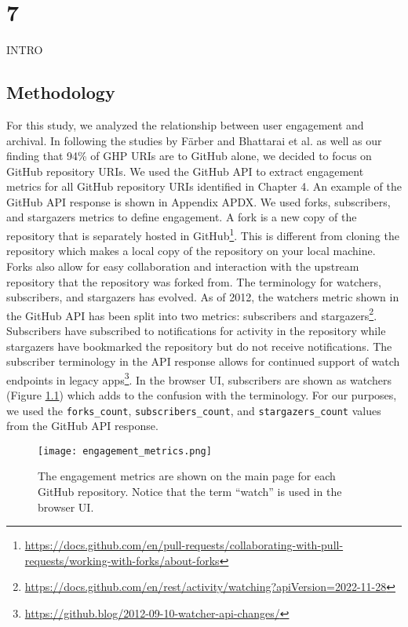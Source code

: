 \chapter{7}
\label{ch:7}


INTRO

\section{Methodology}

For this study, we analyzed the relationship between user engagement and archival. In following the studies by Färber \cite{farber-jcdl2020} and Bhattarai et al. \cite{bhattarai-jcdl22} as well as our finding that 94\% of GHP URIs are to GitHub alone, we decided to focus on GitHub repository URIs. We used the GitHub API to extract engagement metrics for all GitHub repository URIs identified in Chapter 4. An example of the GitHub API response is shown in Appendix APDX. We used forks, subscribers, and stargazers metrics to define engagement. A fork is a new copy of the repository that is separately hosted in GitHub\footnote{\url{https://docs.github.com/en/pull-requests/collaborating-with-pull-requests/working-with-forks/about-forks}}. This is different from cloning the repository which makes a local copy of the repository on your local machine. Forks also allow for easy collaboration and interaction with the upstream repository that the repository was forked from. The terminology for watchers, subscribers, and stargazers has evolved. As of 2012, the watchers metric shown in the GitHub API has been split into two metrics: subscribers and stargazers\footnote{\url{https://docs.github.com/en/rest/activity/watching?apiVersion=2022-11-28}}. Subscribers have subscribed to notifications for activity in the repository while stargazers have bookmarked the repository but do not receive notifications. The subscriber terminology in the API response allows for continued support of watch endpoints in legacy apps\footnote{\url{https://github.blog/2012-09-10-watcher-api-changes/}}. In the browser UI, subscribers are shown as watchers (Figure \ref{fig:engagement_metrics}) which adds to the confusion with the terminology. For our purposes, we used the \verb|forks_count|, \verb|subscribers_count|, and \verb|stargazers_count| values from the GitHub API response.

\begin{figure}
    \centering
    \texttt{[image: engagement\_metrics.png]}
    \caption{The engagement metrics are shown on the main page for each GitHub repository. Notice that the term ``watch'' is used in the browser UI.}
    \label{fig:engagement_metrics}
\end{figure}

